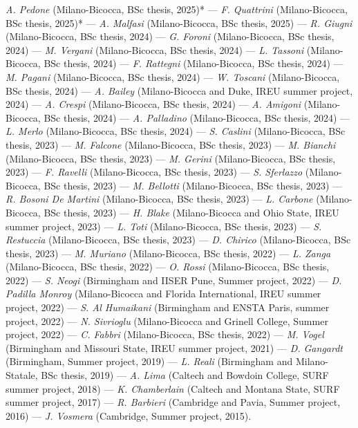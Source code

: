 \textit{A. Pedone} (Milano-Bicocca, BSc thesis, 2025)* --- 
\textit{F. Quattrini} (Milano-Bicocca, BSc thesis, 2025)* --- 
\textit{A. Malfasi} (Milano-Bicocca, BSc thesis, 2025) --- 
\textit{R. Giugni} (Milano-Bicocca, BSc thesis, 2024) --- 
\textit{G. Foroni} (Milano-Bicocca, BSc thesis, 2024) --- 
\textit{M. Vergani} (Milano-Bicocca, BSc thesis, 2024) --- 
\textit{L. Tassoni} (Milano-Bicocca, BSc thesis, 2024) --- 
\textit{F. Rattegni} (Milano-Bicocca, BSc thesis, 2024) --- 
\textit{M. Pagani} (Milano-Bicocca, BSc thesis, 2024) --- 
\textit{W. Toscani} (Milano-Bicocca, BSc thesis, 2024) --- 
\textit{A. Bailey} (Milano-Bicocca and Duke, IREU summer project, 2024) --- 
\textit{A. Crespi} (Milano-Bicocca, BSc thesis, 2024) --- 
\textit{A. Amigoni} (Milano-Bicocca, BSc thesis, 2024) --- 
\textit{A. Palladino} (Milano-Bicocca, BSc thesis, 2024) --- 
\textit{L. Merlo} (Milano-Bicocca, BSc thesis, 2024) --- 
\textit{S. Caslini} (Milano-Bicocca, BSc thesis, 2023) --- 
\textit{M. Falcone} (Milano-Bicocca, BSc thesis, 2023) --- 
\textit{M. Bianchi} (Milano-Bicocca, BSc thesis, 2023) --- 
\textit{M. Gerini} (Milano-Bicocca, BSc thesis, 2023) --- 
\textit{F. Ravelli} (Milano-Bicocca, BSc thesis, 2023) --- 
\textit{S. Sferlazzo} (Milano-Bicocca, BSc thesis, 2023) --- 
\textit{M. Bellotti} (Milano-Bicocca, BSc thesis, 2023) --- 
\textit{R. Bosoni De Martini} (Milano-Bicocca, BSc thesis, 2023) --- 
\textit{L. Carbone} (Milano-Bicocca, BSc thesis, 2023) --- 
\textit{H. Blake} (Milano-Bicocca and Ohio State, IREU summer project, 2023) --- 
\textit{L. Toti} (Milano-Bicocca, BSc thesis, 2023) --- 
\textit{S. Restuccia} (Milano-Bicocca, BSc thesis, 2023) --- 
\textit{D. Chirico} (Milano-Bicocca, BSc thesis, 2023) --- 
\textit{M. Muriano} (Milano-Bicocca, BSc thesis, 2022) --- 
\textit{L. Zanga} (Milano-Bicocca, BSc thesis, 2022) --- 
\textit{O. Rossi} (Milano-Bicocca, BSc thesis, 2022) --- 
\textit{S. Neogi} (Birmingham and IISER Pune, Summer project, 2022) --- 
\textit{D. Padilla Monroy} (Milano-Bicocca and Florida International, IREU summer project, 2022) --- 
\textit{S. Al Humaikani} (Birmingham and ENSTA Paris, summer project, 2022) --- 
\textit{N. Sivrioglu} (Milano-Bicocca and Grinell College, Summer project, 2022) --- 
\textit{C. Fabbri} (Milano-Bicocca, BSc thesis, 2022) --- 
\textit{M. Vogel} (Birmingham and Missouri State, IREU summer project, 2021) --- 
\textit{D. Gangardt} (Birmingham, Summer project, 2019) --- 
\textit{L. Reali} (Birmingham and Milano-Statale, BSc thesis, 2019) --- 
\textit{A. Lima} (Caltech and Bowdoin College, SURF summer project, 2018) --- 
\textit{K. Chamberlain} (Caltech and Montana State, SURF summer project, 2017) --- 
\textit{R. Barbieri} (Cambridge and Pavia, Summer project, 2016) --- 
\textit{J. Vosmera} (Cambridge, Summer project, 2015).